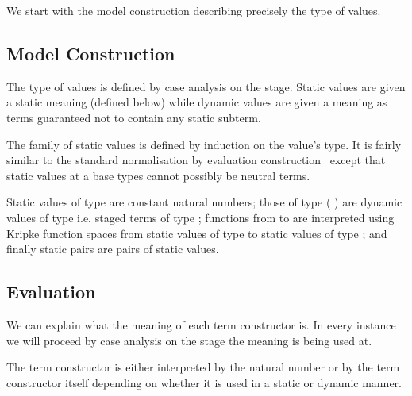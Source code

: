 \documentclass{article}
\begin{document}

We start with the model construction describing precisely
the type of values.

\subsection{Model Construction}

The type of values is defined by case analysis on the stage.
%
Static values are given a static meaning (defined below)
while dynamic values are given a meaning as terms
guaranteed not to contain any static subterm.


The family of static values is defined by induction on
the value's type. It is fairly similar to the standard
normalisation by evaluation
construction~\cite{DBLP:conf/lics/BergerS91,DBLP:journals/mscs/CoquandD97,DBLP:journals/lisp/Coquand02}
except that static values at a base types cannot possibly
be neutral terms.

\begin{AgdaSuppressSpace}
\end{AgdaSuppressSpace}

Static values of type  are constant natural numbers;
those of type ( ) are dynamic values of type 
i.e. staged terms of type ;
functions from  to  are interpreted using Kripke function
spaces from static values of type  to static values of type ;
and finally static pairs are pairs of static values.






\subsection{Evaluation}

We can explain what the meaning of each term constructor is.
In every instance we will proceed by case analysis on the
stage the meaning is being used at.


The term constructor  is either interpreted by
the natural number  or by the term constructor itself
depending on whether it is used in a static or dynamic manner.
\end{document}
